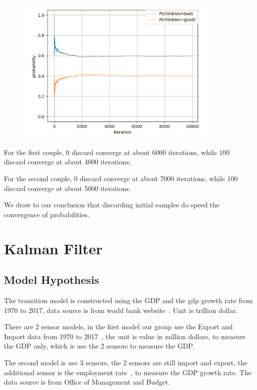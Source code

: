 \documentclass[11pt, a4paper]{article}
\begin{document}
\begin{figure}[htbp]
	
	\centering 
	\includegraphics[width=10cm]{gs_18}
	
	\label{fig:gb18}
	
\end{figure}

\newpage

For the first couple, 0 discard converge at about 6000 iterations, while 100 discard converge at about 4000 iterations;

For the second couple, 0 discard converge at about 7000 iterations, while 100 discard converge at about 5000 iterations.

We draw to our conclusion that discarding initial samples do speed the convergence of probabilities.


\section{Kalman Filter}



\subsection{Model Hypothesis}
The transition model is constructed using the GDP and the gdp growth rate from 1970 to 2017, data source is from world bank website~\cite{ref:source1}. Unit is trillion dollar.

There are 2 sensor models, in the first model our group use the Export and Import data from 1970 to 2017~\cite{ref:source2}, the unit is value in million dollars, to measure the GDP only, which is use the 2 sensors to measure the GDP. 

The second model is use 3 sensors, the 2 sensors are still import and export, the additional sensor is the employment rate~\cite{ref:source3}, to measure the GDP growth rate. The data source is from Office of Management and Budget. 
\end{document}
